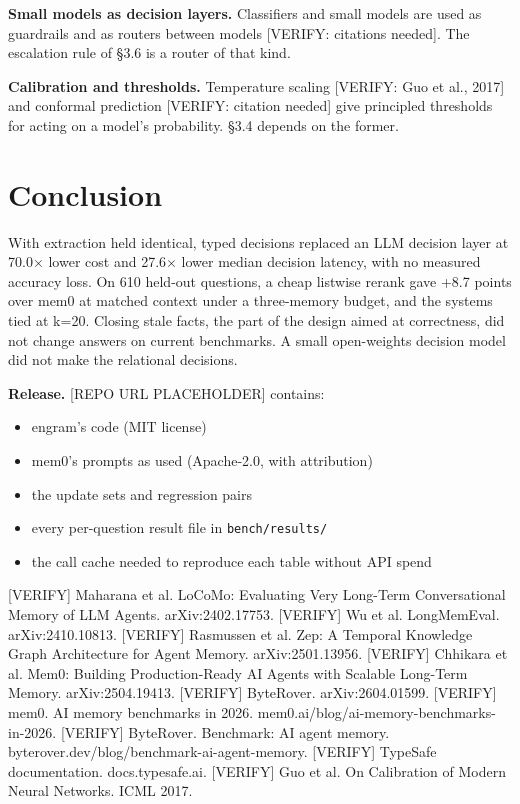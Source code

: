 \documentclass[11pt]{article}
\newcommand{\src}[1]{}
\begin{document}
\textbf{Small models as decision layers.} Classifiers and small models are used as guardrails and as routers between models [VERIFY: citations needed]. The escalation rule of \S{}3.6 is a router of that kind.

\textbf{Calibration and thresholds.} Temperature scaling [VERIFY: Guo et al., 2017] and conformal prediction [VERIFY: citation needed] give principled thresholds for acting on a model's probability. \S{}3.4 depends on the former.

\section{Conclusion}
With extraction held identical, typed decisions replaced an LLM decision layer at 70.0$\times$\src{bench/results/e2_llm__dev.json ÷ bench/results/e2_jev__dev.json} lower cost and 27.6$\times$\src{bench/results/e2_llm__dev.json ÷ bench/results/e2_jev__dev.json} lower median decision latency, with no measured accuracy loss. On 610\src{bench/results/heldout_report.json} held-out questions, a cheap listwise rerank gave +8.7\src{bench/results/mem0_token_matched__heldout_pooled__k6.json} points over mem0 at matched context under a three-memory budget, and the systems tied at k=20. Closing stale facts, the part of the design aimed at correctness, did not change answers on current benchmarks. A small open-weights decision model did not make the relational decisions.

\textbf{Release.} [REPO URL PLACEHOLDER] contains:

\begin{itemize}
\item engram's code (MIT license)
\item mem0's prompts as used (Apache-2.0, with attribution)
\item the update sets and regression pairs
\item every per-question result file in \texttt{bench/results/}
\item the call cache needed to reproduce each table without API spend
\end{itemize}
\begin{thebibliography}{99}
 [VERIFY] Maharana et al. LoCoMo: Evaluating Very Long-Term Conversational Memory of LLM Agents. arXiv:2402.17753.
 [VERIFY] Wu et al. LongMemEval. arXiv:2410.10813.
 [VERIFY] Rasmussen et al. Zep: A Temporal Knowledge Graph Architecture for Agent Memory. arXiv:2501.13956.
 [VERIFY] Chhikara et al. Mem0: Building Production-Ready AI Agents with Scalable Long-Term Memory. arXiv:2504.19413.
 [VERIFY] ByteRover. arXiv:2604.01599.
 [VERIFY] mem0. AI memory benchmarks in 2026. mem0.ai/blog/ai-memory-benchmarks-in-2026.
 [VERIFY] ByteRover. Benchmark: AI agent memory. byterover.dev/blog/benchmark-ai-agent-memory.
 [VERIFY] TypeSafe documentation. docs.typesafe.ai.
 [VERIFY] Guo et al. On Calibration of Modern Neural Networks. ICML 2017.
\end{thebibliography}
\clearpage
\appendix
\end{document}
